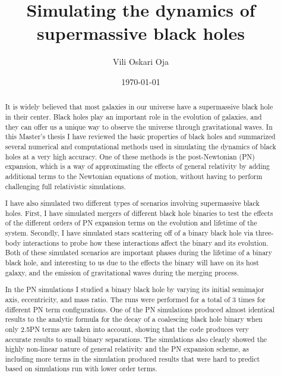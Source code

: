 \documentclass[english, oneside]{HYgradu}
\title{Simulating the dynamics of supermassive black holes}
\author{Vili Oskari Oja}
\date{\today}
\begin{document}
\setlength{\parindent}{1cm}
\setlength{\parskip}{0cm}
\maketitle

\begin{abstract}
It is widely believed that most galaxies in our universe have a supermassive black hole in their center. Black holes play an important role in the evolution of galaxies, and they can offer us a unique way to observe the universe through gravitational waves. In this Master's thesis I have reviewed the basic properties of black holes and summarized several numerical and computational methods used in simulating the dynamics of black holes at a very high accuracy. One of these methods is the post-Newtonian (PN) expansion, which is a way of approximating the effects of general relativity by adding additional terms to the Newtonian equations of motion, without having to perform challenging full relativistic simulations.

I have also simulated two different types of scenarios involving supermassive black holes. First, I have simulated mergers of different black hole binaries to test the effects of the different orders of PN expansion terms on the evolution and lifetime of the system. Secondly, I have simulated stars scattering off of a binary black hole via three-body interactions to probe how these interactions affect the binary and its evolution. Both of these simulated scenarios are important phases during the lifetime of a binary black hole, and interesting to us due to the effects the binary will have on its host galaxy, and the emission of gravitational waves during the merging process.

In the PN simulations I studied a binary black hole by varying its initial semimajor axis, eccentricity, and mass ratio. The runs were performed for a total of 3 times for different PN term configurations. One of the PN simulations produced almost identical results to the analytic formula for the decay of a coalescing black hole binary when only 2.5PN terms are taken into account, showing that the code produces very accurate results to small binary separations. The simulations also clearly showed the highly non-linear nature of general relativity and the PN expansion scheme, as including more terms in the simulation produced results that were hard to predict based on simulations run with lower order terms. 


\end{abstract}
\end{document}
